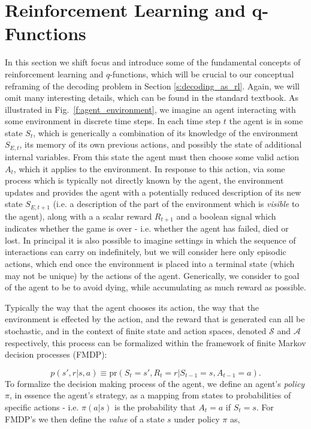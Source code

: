 \documentclass[twocolumn,preprintnumbers,amsmath,amssymb,notitlepage,nofootinbib,longbibliography,superscriptaddress,aps,pra,10pt]{revtex4-1}
\begin{document}
\section{Reinforcement Learning and q-Functions}\label{s:reinforcement_learning}

	In this section we shift focus and introduce some of the fundamental concepts of reinforcement learning and $q$-functions, which will be crucial to our conceptual reframing of the decoding problem in Section \ref{s:decoding_as_rl}.
	Again, we will omit many interesting details, which can be found in the standard textbook. 
	As illustrated in Fig.~\ref{f:agent_environment}, we imagine an agent interacting with some environment in discrete time steps.
	In each time step $t$ the agent is in some state $S_t$, which is generically a combination of its knowledge of the environment $S_{E,t}$, its memory of its own previous actions, and possibly the state of additional internal variables.
	From this state the agent must then choose some valid action $A_t$, which it applies to the environment.
	In response to this action, via some process which is typically not directly known by the agent, the environment updates and provides the agent with a potentially reduced description of its new state $S_{E,t+1}$ (i.e. a description of the part of the environment which is \textit{visible} to the agent), along with a a scalar reward $R_{t+1}$ and a boolean signal which indicates whether the game is over - i.e. whether the agent has failed, died or lost.
	In principal it is also possible to imagine settings in which the sequence of interactions can carry on indefinitely, but we will consider here only episodic actions, which end once the environment is placed into a terminal state (which may not be unique) by the actions of the agent.
	Generically, we consider to goal of the agent to be to avoid dying, while accumulating as much reward as possible.

	Typically the way that the agent chooses its action, the way that the environment is effected by the action, and the reward that is generated can all be stochastic, and in the context of finite state and action spaces, denoted $\mathcal{S}$ and $\mathcal{A}$ respectively, this process can be formalized within the framework of finite Markov decision processes (FMDP):

	\begin{equation}
		p(s',r|s,a) \equiv \mathrm{pr}(S_t = s',R_t = r|S_{t-1} = s, A_{t-1} = a).
	\end{equation}
	To formalize the decision making process of the agent, we define an agent's \textit{policy} $\pi$, in essence the agent's strategy, as a mapping from states to probabilities of specific actions - i.e. $\pi(a|s)$ is the probability that $A_t = a$ if $S_t = s$.
	For FMDP's we then define the \textit{value} of a state $s$ under policy $\pi$ as,
\end{document}

